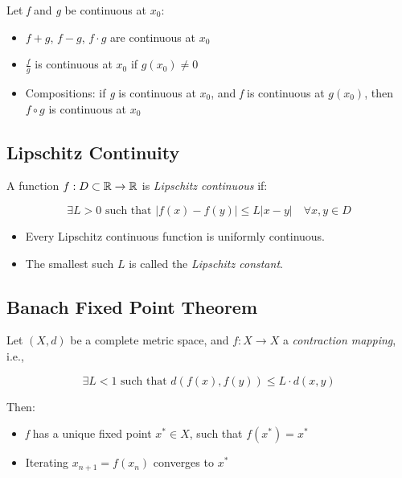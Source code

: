 Let \emph{f} and \emph{g} be continuous at \(x_0\):

\begin{itemize}
    
    \item \(f + g\), \(f - g\), \(f \cdot g\) are continuous at \(x_0\)
    
    \item \(\frac{f}{g}\) is continuous at \(x_0\) if \(g(x_0) \ne 0\)
    
    \item Compositions: if \emph{g} is continuous at \(x_0\), and \emph{f} is continuous at \(g(x_0)\), 
    then \(f \circ g\) is continuous at \(x_0\)

\end{itemize}

\subsection{Lipschitz Continuity}

A function \(f: D \subset \mathbb{R} \to \mathbb{R}\) is \emph{Lipschitz continuous} if:

\[
    \exists L > 0 \text{ such that } |f(x) - f(y)| \le L |x - y| \quad \forall x, y \in D
\]

\begin{itemize}

    \item Every Lipschitz continuous function is uniformly continuous.

    \item The smallest such \(L\) is called the \emph{Lipschitz constant}.

\end{itemize}

\subsection{Banach Fixed Point Theorem}

Let \((X, d)\) be a complete metric space, and \(f: X \to X\) a \emph{contraction mapping}, i.e.,

\[
    \exists L < 1 \text{ such that } d(f(x), f(y)) \le L \cdot d(x, y)
\]

Then:

\begin{itemize}

    \item \emph{f} has a unique fixed point \(x^* \in X\), such that \(f(x^*) = x^*\)

    \item Iterating \(x_{n+1} = f(x_n)\) converges to \(x^*\)

\end{itemize}

